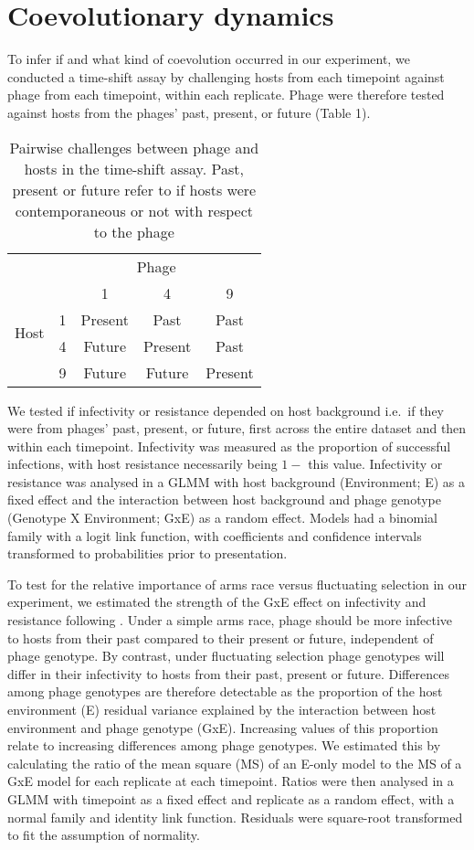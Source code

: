 \documentclass [12pt, a4paper, twoside]  {article}
\begin{document}
\section*{Coevolutionary dynamics}
To infer if and what kind of coevolution occurred in our experiment, we conducted a time-shift assay by challenging hosts from each timepoint against phage from each timepoint, within each replicate. Phage were therefore tested against hosts from the phages' past, present, or future (Table 1).

\begin{table}[!htb]
\centering
\begin{tabular}{c|c|c|c|c}
 	 & \multicolumn{4}{c}{Phage} \\\cline{2-5}
	\multirow{4}{*}{Host} & & 1 & 4 & 9 \\\hline
	& 1 & Present & Past & Past \\\cline{2-5}
	 & 4 & Future & Present & Past \\\cline{2-5}
	& 9 & Future & Future & Present \\

\end{tabular}
\caption{Pairwise challenges between phage and hosts in the time-shift assay. Past, present or future refer to if hosts were contemporaneous or not with respect to the phage}
\end{table}

We tested if infectivity or resistance depended on host background i.e.\ if they were from phages' past, present, or future, first across the entire dataset and then within each timepoint. Infectivity was measured as the proportion of successful infections, with host resistance necessarily being $1-$ this value. Infectivity or resistance was analysed in a GLMM with host background (Environment; E) as a fixed effect and the interaction between host background and phage genotype (Genotype X Environment; GxE) as a random effect. Models had a binomial family with a logit link function, with coefficients and confidence intervals transformed to probabilities prior to presentation.

To test for the relative importance of arms race versus fluctuating selection in our experiment, we estimated the strength of the GxE effect on infectivity and resistance following \citep{hall2011coevophage}. Under a simple arms race, phage should be more infective to hosts from their past compared to their present or future, independent of phage genotype. By contrast, under fluctuating selection phage genotypes will differ in their infectivity to hosts from their past, present or future. Differences among phage genotypes are therefore detectable as the proportion of the host environment (E) residual variance explained by the interaction between host environment and phage genotype (GxE). Increasing values of this proportion relate to increasing differences among phage genotypes. We estimated this by calculating the ratio of the mean square (MS) of an E-only model to the MS of a GxE model for each replicate at each timepoint. Ratios were then analysed in a GLMM with timepoint as a fixed effect and replicate as a random effect, with a normal family and identity link function. Residuals were square-root transformed to fit the assumption of normality. 

\clearpage

\end{document}
